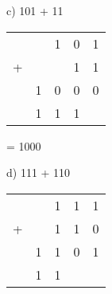 \begin{figure}[H]
    \begin{minipage}[t]{0.45\textwidth}
        c) 101 + 11
        \begin{table}[H]
            \centering
            \begin{tabularx}{0.5\linewidth}{rXXXX}
                & & 1 & 0 & 1\\
                + & & & 1 & 1\\
                \cline{2-5}
                & 1 & 0 & 0 & 0 \\
                \cline{2-5}
                & 1 & 1 & 1 & 
            \end{tabularx}
        \end{table}
        = 1000
    \end{minipage}\hfill
    \begin{minipage}[t]{0.45\textwidth}
        d) 111 + 110
        \begin{table}[H]
            \centering
            \begin{tabularx}{0.5\linewidth}{rXXXX}
                & & 1 & 1 & 1\\
                + & & 1  & 1 & 0\\
                \cline{2-5}
                & 1 & 1 & 0 & 1 \\
                \cline{2-5}
                & 1 & 1 &  & 
            \end{tabularx}
        \end{table}
    \end{minipage}\hfill
\end{figure}

